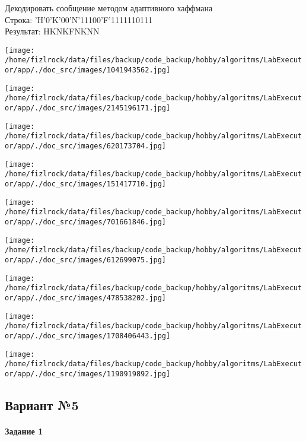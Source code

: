 \documentclass[a4paper, 12pt]{article}
\begin{document}
Декодировать сообщение методом адаптивного хаффмана \\
Строка: 
'H'0'K'00'N'11100'F'1111110111\\
Результат: HKNKFNKNN

\texttt{[image: /home/fizlrock/data/files/backup/code\_backup/hobby/algoritms/LabExecutor/app/./doc\_src/images/1041943562.jpg]}

\texttt{[image: /home/fizlrock/data/files/backup/code\_backup/hobby/algoritms/LabExecutor/app/./doc\_src/images/2145196171.jpg]}

\texttt{[image: /home/fizlrock/data/files/backup/code\_backup/hobby/algoritms/LabExecutor/app/./doc\_src/images/620173704.jpg]}

\texttt{[image: /home/fizlrock/data/files/backup/code\_backup/hobby/algoritms/LabExecutor/app/./doc\_src/images/151417710.jpg]}

\texttt{[image: /home/fizlrock/data/files/backup/code\_backup/hobby/algoritms/LabExecutor/app/./doc\_src/images/701661846.jpg]}

\texttt{[image: /home/fizlrock/data/files/backup/code\_backup/hobby/algoritms/LabExecutor/app/./doc\_src/images/612699075.jpg]}

\texttt{[image: /home/fizlrock/data/files/backup/code\_backup/hobby/algoritms/LabExecutor/app/./doc\_src/images/478538202.jpg]}

\texttt{[image: /home/fizlrock/data/files/backup/code\_backup/hobby/algoritms/LabExecutor/app/./doc\_src/images/1708406443.jpg]}

\texttt{[image: /home/fizlrock/data/files/backup/code\_backup/hobby/algoritms/LabExecutor/app/./doc\_src/images/1190919892.jpg]}
\pagebreak
\subsection{Вариант №5}
\paragraph{Задание 1}
\end{document}
